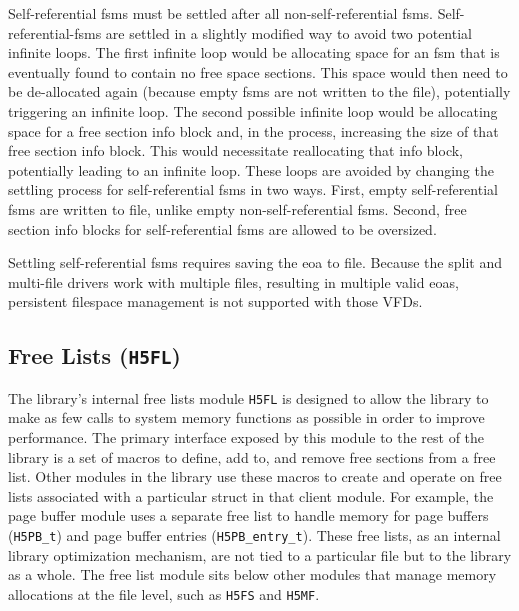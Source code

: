 \begin{itemize}
Self-referential \Glspl{fsm} must be settled after all non-self-referential \Glspl{fsm}. Self-referential-\Glspl{fsm} are settled in a slightly modified way to avoid two potential infinite loops. The first infinite loop would be allocating space for an \Gls{fsm} that is eventually found to contain no free space sections. This space would then need to be de-allocated again (because empty \Glspl{fsm} are not written to the file), potentially triggering an infinite loop. The second possible infinite loop would be allocating space for a free section info block and, in the process, increasing the size of that free section info block. This would necessitate reallocating that info block, potentially leading to an infinite loop. These loops are avoided by changing the settling process for self-referential \Glspl{fsm} in two ways. First, empty self-referential \Glspl{fsm} are written to file, unlike empty non-self-referential \Glspl{fsm}. Second, free section info blocks for self-referential \Glspl{fsm} are allowed to be oversized.

Settling self-referential \Glspl{fsm} requires saving the \gls{eoa} to file. Because the split and multi-file drivers work with multiple files, resulting in multiple valid \glspl{eoa}, persistent filespace management is not supported with those VFDs. 

\end{itemize}

\subsection{Free Lists (\texttt{H5FL})}



The library's internal free lists module \texttt{H5FL}  is designed to allow the library to make as few calls to system memory functions as possible in order to improve performance. The primary interface exposed by this module to the rest of the library is a set of macros to define, add to, and remove free sections from a free list. Other modules in the library use these macros to create and operate on free lists associated with a particular struct in that client module. For example, the page buffer module uses a separate free list to handle memory for page buffers (\texttt{H5PB\_t}) and page buffer entries (\texttt{H5PB\_entry\_t}). These free lists, as an internal library optimization mechanism, are not tied to a particular file but to the library as a whole. The free list module sits below other modules that manage memory allocations at the file level, such as \texttt{H5FS} and \texttt{H5MF}.

